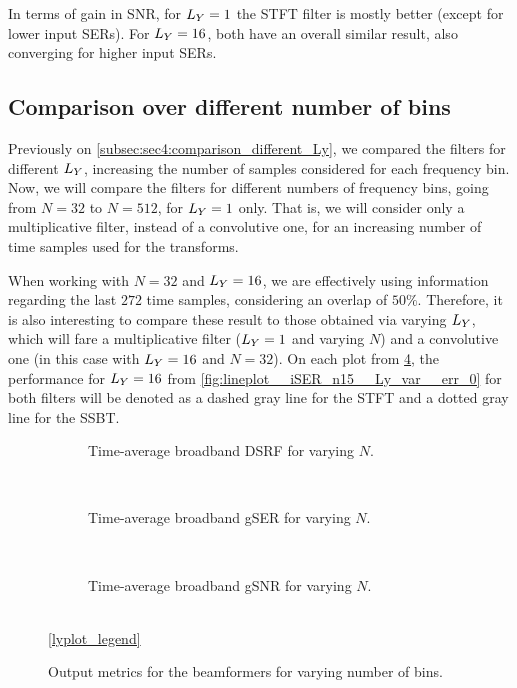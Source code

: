 In terms of gain in SNR, for $\Ly = 1$ the STFT filter is mostly better (except for lower input SERs). For $\Ly = 16$, both have an overall similar result, also converging for higher input SERs.


\subsection{Comparison over different number of bins}

Previously on \cref{subsec:sec4:comparison_different_Ly}, we compared the filters for different $\Ly$, increasing the number of samples considered for each frequency bin. Now, we will compare the filters for different numbers of frequency bins, going from $N = 32$ to $N = 512$, for $\Ly = 1$ only. That is, we will consider only a multiplicative filter, instead of a convolutive one, for an increasing number of time samples used for the transforms.

When working with $N = 32$ and $\Ly = 16$, we are effectively using information regarding the last $272$ time samples, considering an overlap of $50\%$. Therefore, it is also interesting to compare these result to those obtained via varying $\Ly$, which will fare a multiplicative filter ($\Ly = 1$ and varying $N$) and a convolutive one (in this case with $\Ly = 16$ and $N = 32$). On each plot from \cref{fig:lineplot__N_var__iSER_n15__Ly_1__err_0}, the performance for $\Ly = 16$ from \cref{fig:lineplot__iSER_n15__Ly_var__err_0} for both filters will be denoted as a dashed gray line for the STFT and a dotted gray line for the SSBT.


\begin{figure}[!t]
	\centering
	\begin{subfigure}{\textwidth}
		\centering
		
		\caption{Time-average broadband DSRF for varying $N$.}
		\label{subfig:lineplot__DSRF__N_var__iSER_n15}
	\end{subfigure}\\[1em]
	\begin{subfigure}{\textwidth}
		\centering
		
		\caption{Time-average broadband gSER for varying $N$.}
		\label{subfig:lineplot__gSER__N_var__iSER_n15}
	\end{subfigure}\\[1em]
	\begin{subfigure}{\textwidth}
		\centering
		
		\caption{Time-average broadband gSNR for varying $N$.}
		\label{subfig:lineplot__gSNR__N_var__iSER_n15}
	\end{subfigure}\\[1em]
	\ref*{lyplot_legend}
	\caption{Output metrics for the beamformers for varying number of bins.}
	\label{fig:lineplot__N_var__iSER_n15__Ly_1__err_0}
\end{figure}

